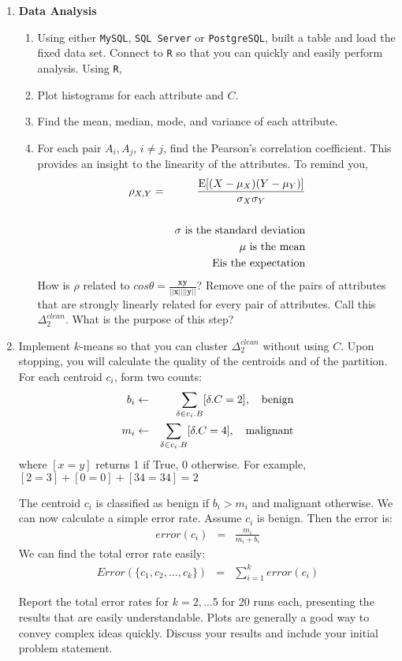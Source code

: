 \documentclass{article}
\begin{document}
\begin{enumerate}
  \item {\bf Data Analysis}
   \begin{enumerate} \item Using either \texttt{MySQL}, \texttt{SQL Server} or \texttt{PostgreSQL}, built a table and load the fixed data set.  Connect to \texttt{R} so that you can quickly and easily perform analysis.  Using \texttt{R}, 
\item Plot histograms for each attribute and $C$.
 \item Find the mean, median, mode, and variance of each attribute.
 \item For each pair $A_i, A_j$, $i \neq j$, find the Pearson's correlation coefficient. This provides an insight to the linearity of the attributes.  To remind you,
 \begin{eqnarray*}
 \rho_{X,Y} &=& \frac{\mathrm{E}[(X - \mu_X)(Y-\mu_Y)]}{\sigma_X\sigma_Y}\\
 &&\\
 &&\sigma\ \mbox{\rm is the standard deviation}\\
 && \mu\ \mbox{\rm is the mean} \\
 &&\ \mathrm{E} \mbox{\rm is the expectation}
 \end{eqnarray*}
 How is $\rho$ related to $cos \theta = \frac{\mathbf{x}\mathbf{y}}{||\mathbf{x}|| ||\mathbf{y}||}$?  Remove one of the pairs of attributes that are strongly linearly related for every pair of attributes.  Call this $\Delta_2^{clean}$.  What is the purpose of this step?
 \end{enumerate} 
  \item  Implement $k$-means so that you can cluster $\Delta_2^{clean}$ without using $C$.  Upon stopping, you will calculate the quality of the centroids and of the partition.  For each centroid $c_i$, form two counts:
  \begin{eqnarray*}
  b_i &\gets& \sum_{\delta \in c_i.B} [\delta.C = 2],\ \ \ \mbox{\rm benign}\\
  m_i &\gets& \sum_{\delta \in c_i.B} [\delta.C = 4], \ \ \ \mbox{\rm malignant}
  \end{eqnarray*}
  where $[x = y]$ returns 1 if True, 0 otherwise.  For example, $[2 = 3] + [0 = 0] + [34 = 34] = 2$
  
  The centroid $c_i$ is classified as benign if $b_i > m_i$ and malignant otherwise.  We can now calculate a simple error rate.    Assume $c_i$ is benign.  Then the error is:
 \begin{eqnarray*}
 error(c_i) &=& \frac{m_i}{m_i + b_i}
 \end{eqnarray*}
 We can find the total error rate easily:
 \begin{eqnarray*}
 Error(\{c_1, c_2, \ldots, c_k\}) &=& \sum_{i=1}^k error(c_i)
 \end{eqnarray*}

Report the total error rates for $k = 2,\ldots 5$ for 20 runs each, presenting the results that are easily understandable.  Plots are generally a good way to convey complex ideas quickly.  Discuss your results and include your initial problem statement.    
\end{enumerate}
\end{document}
